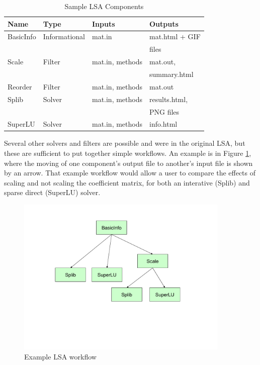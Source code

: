 \begin{table}
    \begin{center}
        \begin{tabular}{||l|l|l|l||} \hline \hline
            {\bf Name}      &  {\bf Type}      & {\bf Inputs}     & {\bf Outputs} \\ \hline \hline
			BasicInfo       &  Informational   &  mat.in          &  mat.html + GIF \\ 
			                &                  &                  &  files        \\ \hline
			Scale           &  Filter          &  mat.in, methods &  mat.out,     \\
			                &                  &                  &  summary.html \\ \hline
			Reorder         &  Filter          &  mat.in, methods &  mat.out      \\ \hline
			Splib           &  Solver          &  mat.in, methods &  results.html,\\
			                &                  &                  &  PNG files    \\ \hline
			SuperLU         &  Solver          &  mat.in, methods &  info.html    \\ \hline \hline
        \end{tabular}
    \end{center}
    \caption{\label{lsacomponents} Sample LSA Components}
\end{table}

Several other solvers and filters are possible and were in the original
LSA, but these are sufficient to put together simple workflows. An example
is in Figure \ref{lsaworkflow}, where the moving of one component's output file to
another's input file is shown by an arrow. That example workflow would allow a user
to compare the effects of scaling and not scaling the coefficient matrix,
for both an interative (Splib) and sparse direct (SuperLU) solver.
\begin{figure}
\centering
\includegraphics[width=4.0in]{tree}
\caption{Example LSA workflow}
\label{lsaworkflow}
\end{figure}

